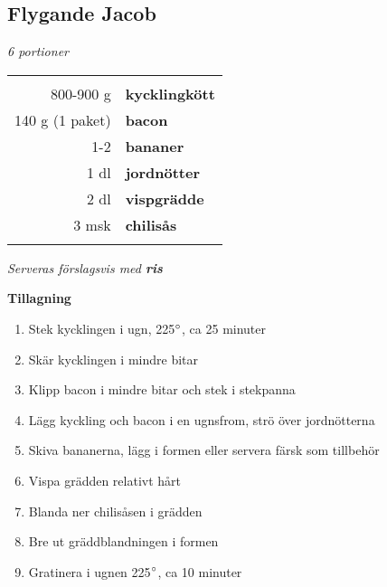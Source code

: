 \documentclass[a4paper,12pt]{article}
\newcommand{\port}[1]{\noindent \textit{#1 portioner}}
\newcommand{\tillb}[1]{\noindent \textit{Serveras förslagsvis med \textbf{#1}} \vspace{1cm}}
\begin{document}
\clearpage

\subsection{Flygande Jacob}
\port{6}

\begin{table}[H]
	\begin{tabular}{rl}
	\hline
	&\\
		800-900 g & \textbf{kycklingkött}\\
		140 g (1 paket) & \textbf{bacon}\\
		1-2 & \textbf{bananer}\\
		1 dl & \textbf{jordnötter}\\
		2 dl & \textbf{vispgrädde}\\
		3 msk & \textbf{chilisås}\\
	&\\
	\hline
	\end{tabular}
\end{table}

\tillb{ris}

\begin{multicols*}{2}

\noindent \textbf{Tillagning}
\begin{enumerate}
	\itemsep0cm
	\item Stek kycklingen i ugn, 225$\degree$, ca 25 minuter
	\item Skär kycklingen i mindre bitar
	\item Klipp bacon i mindre bitar och stek i stekpanna
	\item Lägg kyckling och bacon i en ugnsfrom, strö över \mbox{jordnötterna}
	\item Skiva bananerna, lägg i formen eller servera färsk som tillbehör
	\item Vispa grädden relativt hårt
	\item Blanda ner chilisåsen i grädden
	\item Bre ut gräddblandningen i \mbox{formen}
	\item Gratinera i ugnen 225$\degree$, ca 10 minuter
\end{enumerate}

\end{multicols*}

\clearpage

\end{document}

